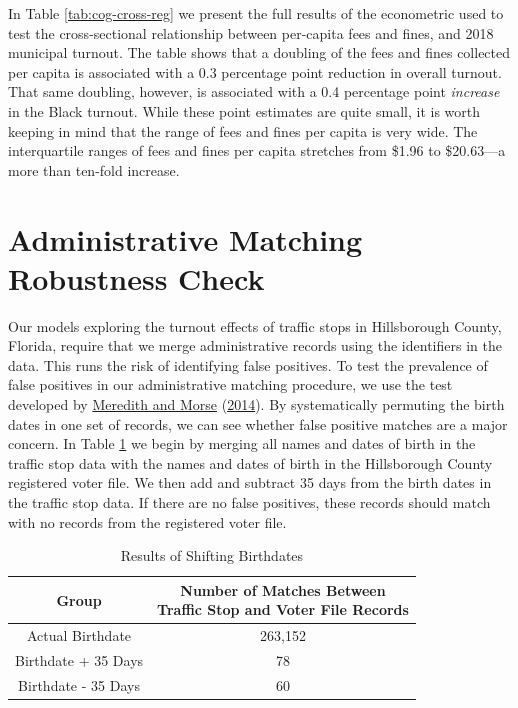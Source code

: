 \documentclass[
  12pt,
]{article}
\begin{document}
In Table \ref{tab:cog-cross-reg} we present the full results of the econometric used to test the cross-sectional relationship between per-capita fees and fines, and 2018 municipal turnout. The table shows that a doubling of the fees and fines collected per capita is associated with a 0.3 percentage point reduction in overall turnout. That same doubling, however, is associated with a 0.4 percentage point \emph{increase} in the Black turnout. While these point estimates are quite small, it is worth keeping in mind that the range of fees and fines per capita is very wide. The interquartile ranges of fees and fines per capita stretches from \$1.96 to \$20.63---a more than ten-fold increase.

\begin{singlespace}

\end{singlespace}

\hypertarget{administrative-matching-robustness-check}{%
\section*{Administrative Matching Robustness Check}\label{administrative-matching-robustness-check}}

Our models exploring the turnout effects of traffic stops in Hillsborough County, Florida, require that we merge administrative records using the identifiers in the data. This runs the risk of identifying false positives. To test the prevalence of false positives in our administrative matching procedure, we use the test developed by \protect\hyperlink{ref-Meredith2014}{Meredith and Morse} (\protect\hyperlink{ref-Meredith2014}{2014}). By systematically permuting the birth dates in one set of records, we can see whether false positive matches are a major concern. In Table \ref{tab:change-dobs} we begin by merging all names and dates of birth in the traffic stop data with the names and dates of birth in the Hillsborough County registered voter file. We then add and subtract 35 days from the birth dates in the traffic stop data. If there are no false positives, these records should match with no records from the registered voter file.

\begin{singlespace}
\begin{table}[H]

\caption{\label{tab:shift-dobs-chunk}\label{tab:change-dobs} Results of Shifting Birthdates}
\centering
\begin{tabular}[t]{cc}
\toprule
Group & \makecell[c]{Number of Matches Between\\Traffic Stop and Voter File Records}\\
\midrule
Actual Birthdate & 263,152\\
Birthdate + 35 Days & 78\\
Birthdate - 35 Days & 60\\
\bottomrule
\end{tabular}
\end{table}
\end{singlespace}
\end{document}
